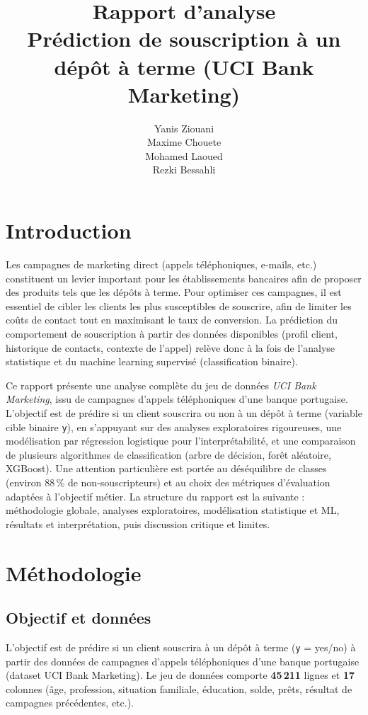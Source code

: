 \documentclass[11pt,a4paper]{article}
\title{Rapport d'analyse \\ Prédiction de souscription à un dépôt à terme (UCI Bank Marketing)}
\author{Yanis Ziouani \\ Maxime Chouete \\ Mohamed Laoued \\ Rezki Bessahli}
\date{}
\begin{document}
\maketitle
\tableofcontents
\newpage

\section{Introduction}

Les campagnes de marketing direct (appels téléphoniques, e-mails, etc.) constituent un levier important pour les établissements bancaires afin de proposer des produits tels que les dépôts à terme. Pour optimiser ces campagnes, il est essentiel de cibler les clients les plus susceptibles de souscrire, afin de limiter les coûts de contact tout en maximisant le taux de conversion. La prédiction du comportement de souscription à partir des données disponibles (profil client, historique de contacts, contexte de l'appel) relève donc à la fois de l'analyse statistique et du machine learning supervisé (classification binaire).

Ce rapport présente une analyse complète du jeu de données \emph{UCI Bank Marketing}, issu de campagnes d'appels téléphoniques d'une banque portugaise. L'objectif est de prédire si un client souscrira ou non à un dépôt à terme (variable cible binaire \texttt{y}), en s'appuyant sur des analyses exploratoires rigoureuses, une modélisation par régression logistique pour l'interprétabilité, et une comparaison de plusieurs algorithmes de classification (arbre de décision, forêt aléatoire, XGBoost). Une attention particulière est portée au déséquilibre de classes (environ 88\,\% de non-souscripteurs) et au choix des métriques d'évaluation adaptées à l'objectif métier. La structure du rapport est la suivante : méthodologie globale, analyses exploratoires, modélisation statistique et ML, résultats et interprétation, puis discussion critique et limites.

\section{Méthodologie}

\subsection{Objectif et données}
L'objectif est de prédire si un client souscrira à un dépôt à terme (\texttt{y} = yes/no) à partir des données de campagnes d'appels téléphoniques d'une banque portugaise (dataset UCI Bank Marketing). Le jeu de données comporte \textbf{45\,211} lignes et \textbf{17} colonnes (âge, profession, situation familiale, éducation, solde, prêts, résultat de campagnes précédentes, etc.).
\end{document}
